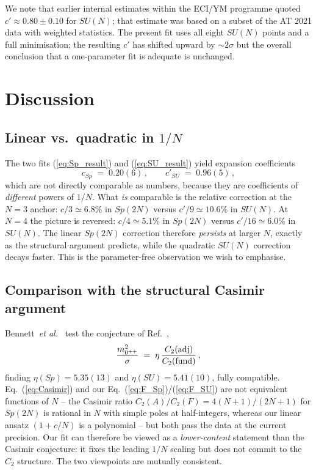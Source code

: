 \documentclass[aps,prd,reprint,nofootinbib,superscriptaddress,floatfix]{revtex4-2}
\begin{document}
We note that earlier internal estimates within the ECI/YM programme
quoted $c' \approx 0.80 \pm 0.10$ for $SU(N)$; that estimate was based on
a subset of the AT 2021 data with weighted statistics. The present fit
uses all eight $SU(N)$ points and a full minimisation; the resulting
$c'$ has shifted upward by $\sim\!2\sigma$ but the overall conclusion
that a one-parameter fit is adequate is unchanged.

\section{Discussion}\label{sec:discuss}

\subsection{Linear vs.\ quadratic in $1/N$}
The two fits (\ref{eq:Sp_result}) and (\ref{eq:SU_result}) yield
expansion coefficients
\begin{equation*}
   c_{Sp}\;=\;0.20(6)\,, \qquad
   c'_{SU}\;=\;0.96(5)\,,
\end{equation*}
which are not directly comparable as numbers, because they are
coefficients of \emph{different} powers of $1/N$. What \emph{is}
comparable is the relative correction at the $N=3$ anchor:
$c/3 \simeq 6.8\%$ in $Sp(2N)$ versus $c'/9 \simeq 10.6\%$ in
$SU(N)$. At $N=4$ the picture is reversed: $c/4 \simeq 5.1\%$ in
$Sp(2N)$ versus $c'/16 \simeq 6.0\%$ in $SU(N)$. The linear
$Sp(2N)$ correction therefore \emph{persists} at larger $N$,
exactly as the structural argument predicts, while the quadratic
$SU(N)$ correction decays faster. This is the parameter-free
observation we wish to emphasise.

\subsection{Comparison with the structural Casimir argument}
Bennett~\emph{et al.}~\cite{BennettHolligan2021} test the conjecture of
Ref.~\cite{LuciniTeperWenger2004},
\begin{equation}
   \frac{m_{0^{++}}^{2}}{\sigma}
   \;=\; \eta\,\frac{C_2({\rm adj})}{C_2({\rm fund})}\,,
   \label{eq:Casimir}
\end{equation}
finding $\eta(Sp) = 5.35(13)$ and $\eta(SU) = 5.41(10)$, fully
compatible. Eq.~(\ref{eq:Casimir}) and our Eq.~(\ref{eq:F_Sp})/(\ref{eq:F_SU})
are not equivalent functions of $N$ -- the Casimir ratio
$C_2(A)/C_2(F) = 4(N+1)/(2N+1)$ for $Sp(2N)$ is rational in $N$
with simple poles at half-integers, whereas our linear ansatz
$(1+c/N)$ is a polynomial -- but both pass the data at the
current precision. Our fit can therefore be viewed as a
\emph{lower-content} statement than the Casimir conjecture: it
fixes the leading $1/N$ scaling but does not commit to the
$C_2$ structure. The two viewpoints are mutually consistent.
\end{document}

